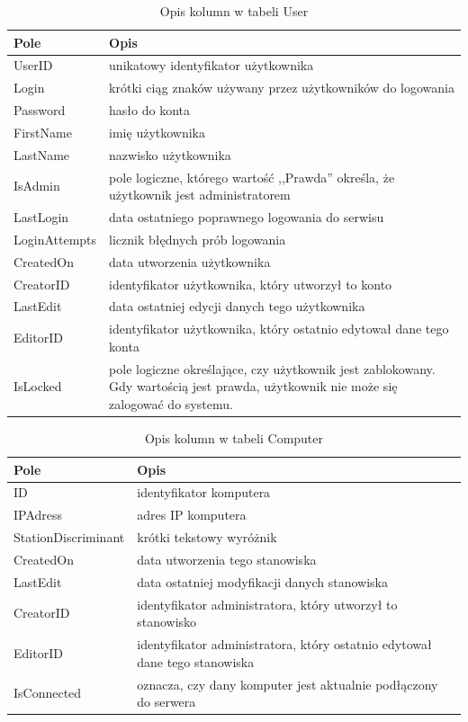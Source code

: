 \begin{table}[!ht]
\caption{Opis kolumn w tabeli User}
\label{tab:user_descr}
\begin{tabular}{| m{3.5cm} | m{10.5cm} |} 

\hline
Pole & Opis \\ \hline

UserID & unikatowy identyfikator użytkownika\\ \hline
Login & krótki ciąg znaków używany przez użytkowników do logowania \\ \hline 
Password & hasło do konta \\ \hline
FirstName & imię użytkownika \\ \hline
LastName & nazwisko użytkownika \\ \hline
IsAdmin & pole logiczne, którego wartość ,,Prawda'' określa, że użytkownik jest administratorem \\ \hline
LastLogin & data ostatniego poprawnego logowania do serwisu \\ \hline
LoginAttempts & licznik błędnych prób logowania \\ \hline
CreatedOn & data utworzenia użytkownika \\ \hline
CreatorID & identyfikator użytkownika, który utworzył to konto \\ \hline
LastEdit & data ostatniej edycji danych tego użytkownika \\ \hline
EditorID & identyfikator użytkownika, który ostatnio edytował dane tego konta \\ \hline
IsLocked & pole logiczne określające, czy użytkownik jest zablokowany. Gdy wartością jest prawda, użytkownik nie może się zalogować do systemu.
\\ \hline
\end{tabular}
\end{table}

\begin{table}[!ht]
\caption{Opis kolumn w tabeli Computer}
\label{tab:comp_descr}
\begin{tabular}{| m{3.5cm} | m{10.5cm} |} 

\hline
Pole & Opis \\ \hline

ID & identyfikator komputera \\ \hline
IPAdress & adres IP komputera \\ \hline
StationDiscriminant & krótki tekstowy wyróżnik\\ \hline
CreatedOn & data utworzenia tego stanowiska \\ \hline
LastEdit & data ostatniej modyfikacji danych stanowiska \\ \hline
CreatorID & identyfikator administratora, który utworzył to stanowisko \\ \hline
EditorID & identyfikator administratora, który ostatnio edytował dane tego stanowiska \\ \hline
IsConnected & oznacza, czy dany komputer jest aktualnie podłączony do serwera \\ \hline
\end{tabular}
\end{table}

